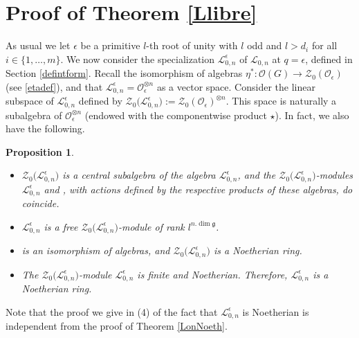 \documentclass[10pt,a4paper]{amsart}
\numberwithin{equation}{section}
\newtheorem{prop}[teo]{Proposition}
\theoremstyle{definition}
\newcommand{\e}{\epsilon}
\newcommand{\Ll}{{\mathcal L}}
\newcommand{\Oo}{{\mathcal O}}
\newcommand{\ra}{\rightarrow}
\begin{document}
\section[Proof of Theorem 1.2]{Proof of Theorem \ref{Llibre}}\label{ORDER} As usual we let $\e$ be a primitive $l$-th root of unity with $l$ odd and $l>d_i$ for all $i\in \{1,\dots,m\}$. We now consider the specialization $\Ll_{0,n}^\e$ of $\Ll_{0,n}$ at $q=\e$, defined in Section \ref{defintform}. Recall the isomorphism of algebras $\eta^*\colon \Oo(G)\ra \mathcal{Z}_0(\Oo_\e)$ (see \eqref{etadef}), and that $\Ll_{0,n}^\e = \Oo_\e^{\otimes n}$ as a vector space. Consider the linear subspace of $\Ll_{0,n}^\e$ defined by $\mathcal{Z}_0\bigl(\Ll_{0,n}^\e\bigr) := \mathcal{Z}_0(\Oo_\e)^{\otimes n}$.
This space is naturally a subalgebra of $\Oo_\e^{\otimes n}$ (endowed with the componentwise product $\star$). In fact, we also have the following.

\begin{prop} \label{Z0L0n} \quad
\begin{itemize}\itemsep=0pt
\item[$(1)$] $\mathcal{Z}_0\bigl(\Ll_{0,n}^\e\bigr)$ is a central subalgebra of the algebra $\Ll_{0,n}^\e$, and the $\mathcal{Z}_0\bigl(\Ll_{0,n}^\e\bigr)$-modules $\Ll_{0,n}^\e$ and \smash{$\Oo_\e^{\otimes n}$}, with actions defined by the respective products of these algebras, do coincide.
\item[$(2)$] $\Ll_{0,n}^\e$ is a free $\mathcal{Z}_0\bigl(\Ll_{0,n}^\e\bigr)$-module of rank $l^{n.\dim \mathfrak{g}}$.
\item[$(3)$] \smash{$\big(\eta^*{}^{-1}\big)^{\otimes n}\colon \mathcal{Z}_0\bigl(\Ll_{0,n}^\e\bigr)\ra\Oo(G)^{\otimes n}$} is an isomorphism of algebras, and $\mathcal{Z}_0\bigl(\Ll_{0,n}^\e\bigr)$ is a Noetherian ring.
\item[$(4)$] The $\mathcal{Z}_0\bigl(\Ll_{0,n}^\e\bigr)$-module $\Ll_{0,n}^\e$ is finite and Noetherian. Therefore, $\Ll_{0,n}^\e$ is a Noetherian ring.
\end{itemize}
\end{prop}
Note that the proof we give in (4) of the fact that $\Ll_{0,n}^\e$ is Noetherian is independent from the proof of Theorem \ref{LonNoeth}.
\end{document}

